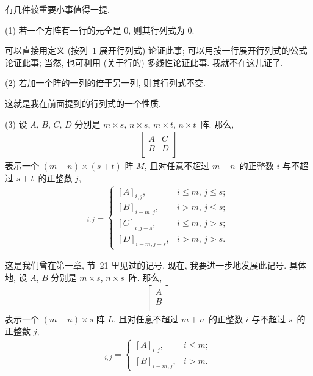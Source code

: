 \documentclass[%
    UTF8,%
    fontset=none,%
    punct=kaiming,%
    zihao=-4,%
    a4paper,%
    oneside,%
]{ctexbook}
\renewcommand*{\leq}{\leqslant}
\begin{document}
有几件较重要小事值得一提.

(1)
若一个方阵有一行的元全是 \(0\),
则其行列式为 \(0\).

可以直接用定义 (按列~\(1\) 展开行列式) 论证此事;
可以用按一行展开行列式的公式论证此事;
当然, 也可利用 (关于行的) 多线性论证此事.
我就不在这儿证了.

(2)
若加一个阵的一列的倍于另一列, 则其行列式不变.

这就是我在前面提到的行列式的一个性质.

(3)
设 \(A\), \(B\), \(C\), \(D\)
分别是 \(m \times s\), \(n \times s\),
\(m \times t\), \(n \times t\)~阵.
那么,
\begin{align*}
    \begin{bmatrix}
        A & C \\
        B & D \\
    \end{bmatrix}
\end{align*}
表示一个 \((m + n) \times (s + t)\)-阵 \(M\),
且对任意不超过 \(m + n\)~的正整数 \(i\)
与不超过 \(s + t\)~的正整数 \(j\),
\begin{align*}
    [M]_{i,j}
    = \begin{cases}
          [A]_{i,j},
           & \text{\(i \leq m\), \(j \leq s\)}; \\
          [B]_{i-m,j},
           & \text{\(i > m\), \(j \leq s\)};    \\
          [C]_{i,j-s},
           & \text{\(i \leq m\), \(j > s\)};    \\
          [D]_{i-m,j-s},
           & \text{\(i > m\), \(j > s\)}.
      \end{cases}
\end{align*}

这是我们曾在第一章, 节~21 里见过的记号.
现在, 我要进一步地发展此记号.
具体地,
设 \(A\), \(B\)
分别是 \(m \times s\), \(n \times s\)~阵.
那么,
\begin{align*}
    \begin{bmatrix}
        A \\
        B \\
    \end{bmatrix}
\end{align*}
表示一个 \((m + n) \times s\)-阵 \(L\),
且对任意不超过 \(m + n\)~的正整数 \(i\)
与不超过 \(s\)~的正整数 \(j\),
\begin{align*}
    [L]_{i,j}
    = \begin{cases}
          [A]_{i,j},
           & \text{\(i \leq m\)}; \\
          [B]_{i-m,j},
           & \text{\(i > m\)}.
      \end{cases}
\end{align*}
\end{document}
